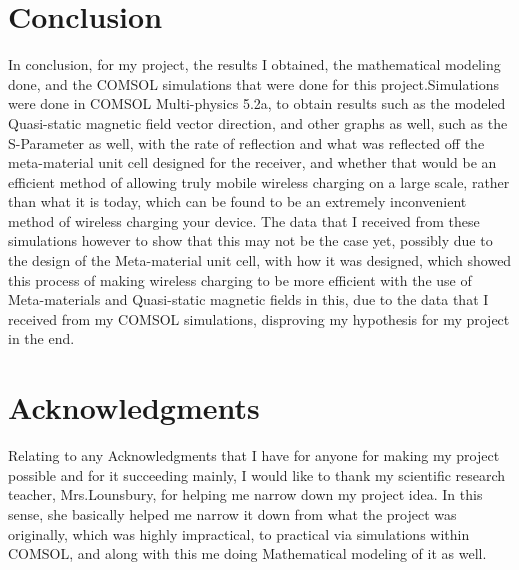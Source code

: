 \documentclass[]{article}
\begin{document}
\section*{Conclusion}
In conclusion, for my project, the results I obtained, the mathematical modeling done, and the COMSOL simulations that were done for this project.Simulations were done in COMSOL Multi-physics 5.2a, to obtain results such as the modeled Quasi-static magnetic field vector direction, and other graphs as well, such as the S-Parameter as well, with the rate of reflection and what was reflected off the meta-material unit cell designed for the receiver, and whether that would be an efficient method of allowing truly mobile wireless charging on a large scale, rather than what it is today, which can be found to be an extremely inconvenient method of wireless charging your device. The data that I received from these simulations however to show that this may not be the case yet, possibly due to the design of the Meta-material unit cell, with how it was designed, which showed this process of making wireless charging to be more efficient with the use of Meta-materials and Quasi-static magnetic fields in this, due to the data that I received from my COMSOL simulations, disproving my hypothesis for my project in the end.
\section*{Acknowledgments}
Relating to any Acknowledgments that I have for anyone for making my project possible and for it succeeding mainly, I would like to thank my scientific research teacher, Mrs.Lounsbury, for helping me narrow down my project idea. In this sense, she basically helped me narrow it down from what the project was originally, which was highly impractical, to practical via simulations within COMSOL, and along with this me doing Mathematical modeling of it as well. 
\end{document}
